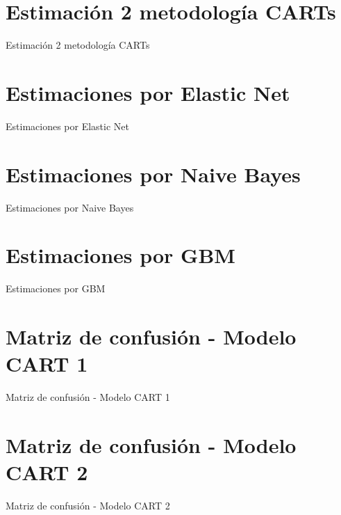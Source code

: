 \documentclass[12pt,a4paper,onecolumn]{article}
\begin{document}
\section{Estimación 2 metodología CARTs}
\begin{table}[htbp]
\centering
\caption{Estimación 2 metodología CARTs}
\label{tab:06_tabla_2_cart}

\end{table}

\section{Estimaciones por Elastic Net}
\begin{table}[htbp]
\centering
\caption{Estimaciones por Elastic Net}
\label{tab:07_tabla_elastic_net}

\end{table}

\section{Estimaciones por Naive Bayes}
\begin{table}[htbp]
\centering
\caption{Estimaciones por Naive Bayes}
\label{tab:08_tabla_naive_bayes}

\end{table}

\section{Estimaciones por GBM}
\begin{table}[htbp]
\centering
\caption{Estimaciones por GBM}
\label{tab:09_tabla_gbm}

\end{table}

\section{Matriz de confusión - Modelo CART 1}
\begin{table}[htbp]
\centering
\caption{Matriz de confusión - Modelo CART 1}
\label{tab:10_matriz_1_cart}

\end{table}

\section{Matriz de confusión - Modelo CART 2}
\begin{table}[htbp]
\centering
\caption{Matriz de confusión - Modelo CART 2}
\label{tab:11_matriz_2_cart}

\end{table}
\end{document}

